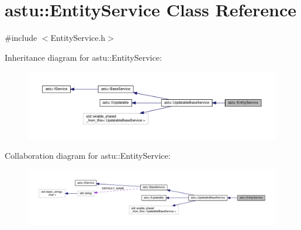 \hypertarget{classastu_1_1EntityService}{}\section{astu\+:\+:Entity\+Service Class Reference}
\label{classastu_1_1EntityService}


{\ttfamily \#include $<$Entity\+Service.\+h$>$}



Inheritance diagram for astu\+:\+:Entity\+Service\+:\nopagebreak
\begin{figure}[H]
\begin{center}
\leavevmode
\includegraphics[width=350pt]{classastu_1_1EntityService__inherit__graph}
\end{center}
\end{figure}


Collaboration diagram for astu\+:\+:Entity\+Service\+:\nopagebreak
\begin{figure}[H]
\begin{center}
\leavevmode
\includegraphics[width=350pt]{classastu_1_1EntityService__coll__graph}
\end{center}
\end{figure}
